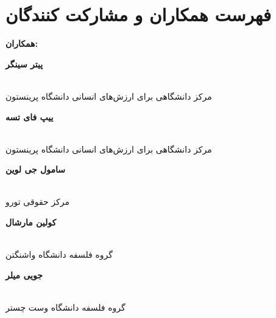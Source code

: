 
{
\section*{فهرست همکاران و مشارکت کنندگان}
\label{sec:فهرست همکاران و مشارکت کنندگان}
}

\begin{multicols}{2} %
    \begin{flushright}
        \begin{Large}
            \textbf{همکاران:}
        \end{Large}
    \end{flushright}

    \begin{flushright}
        \begin{normalsize}
            \textbf{پیتر سینگر}
        \end{normalsize}
        \\
        مرکز دانشگاهی برای ارزش‌های انسانی دانشگاه پرینستون
    \end{flushright}

    \begin{flushright}
        \begin{normalsize}
            \textbf{ییپ فای تسه}
        \end{normalsize}
        \\
        مرکز دانشگاهی برای ارزش‌های انسانی دانشگاه پرینستون
    \end{flushright}

    \begin{flushright}
        \begin{normalsize}
            \textbf{سامول جی لوین}
        \end{normalsize}
        \\
        مرکز حقوقی تورو
    \end{flushright}

    \begin{flushright}
        \begin{normalsize}
            \textbf{کولین مارشال}
        \end{normalsize}
        \\
        گروه فلسفه دانشگاه واشنگتن
    \end{flushright}

    \begin{flushright}
        \begin{normalsize}
            \textbf{جویی میلر}
        \end{normalsize}
        \\
        گروه فلسفه دانشگاه وست چستر
    \end{flushright}


\end{multicols}

